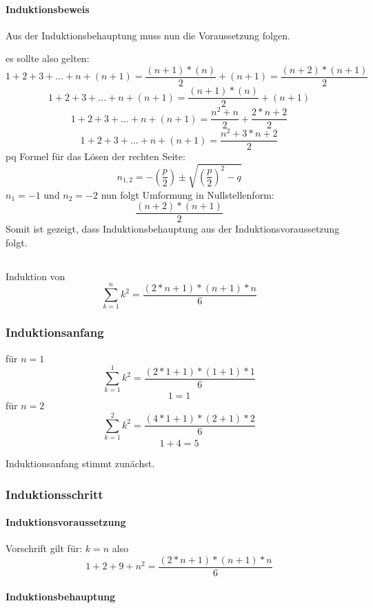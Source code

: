 \documentclass{article}
\begin{document}
\paragraph{Induktionsbeweis}\mbox{}

Aus der Induktionsbehauptung muss nun die Voraussetzung folgen.

es sollte also gelten: \[1+2+3+...+n+(n+1) = \frac{(n+1)*(n)}{2}+(n+1) = \frac{(n+2)*(n+1)}{2}\]
\[1+2+3+...+n+(n+1) = \frac{(n+1)*(n)}{2}+(n+1) \]
\[1+2+3+...+n+(n+1) = \frac{n^2+n}{2}+ \frac{2*n+2}{2} \]
\[1+2+3+...+n+(n+1) = \frac{n^2+3*n+2}{2}\]
pq Formel für das Lösen der rechten Seite: \[n_{1,2} = -\left(\frac{p}{2}\right) \pm \sqrt{ \left(\frac{p}{2}\right)^{2}-q} \]
 $n_1=-1$ und  $n_2=-2$
 \newline
nun folgt Umformung in Nullstellenform:
\[\frac{(n+2)*(n+1)}{2} \]
\newline
Somit ist gezeigt, dass Induktionsbehauptung aus der Induktionsvoraussetzung folgt.

\subsection{}
Induktion von \[ \sum_{k=1}^{n}{k^2} = \frac{(2*n+1)*(n+1)*n}{6} \]
\subsubsection{Induktionsanfang}

für $n=1$
\[ \sum_{k=1}^{1}{k^2} = \frac{(2*1+1)*(1+1)*1}{6} \]
\[ 1 = 1 \]
\newline
für $n=2$
\[ \sum_{k=1}^{2}{k^2} = \frac{(4*1+1)*(2+1)*2}{6} \]
\[ 1+4 = 5 \]
\newline

Induktionsanfang stimmt zunächst.
\subsubsection{Induktionsschritt}
\paragraph{Induktionsvoraussetzung}\mbox{}

Vorschrift gilt für: $k=n$ also \[1+2+9+n^2 =\frac{(2*n+1)*(n+1)*n}{6} \]

\paragraph{Induktionsbehauptung}\mbox{}
\end{document}
